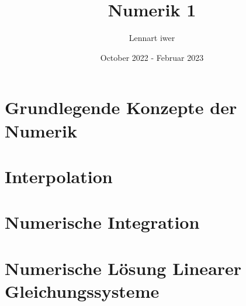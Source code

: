 \documentclass{Skript}
\title{Numerik 1}
\author{Lennart \scalebox{.1}{\Cock{20}}iwer}
\date{October 2022 - Februar 2023}
\begin{document}
\maketitle
\newpage
\tableofcontents
\newpage

\chapter{Grundlegende Konzepte der Numerik}


\chapter{Interpolation}


\chapter{Numerische Integration}


\chapter{Numerische Lösung Linearer Gleichungssysteme}

\end{document}
